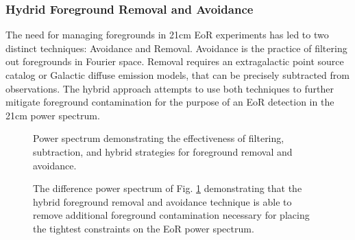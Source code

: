 \documentclass[a0,landscape]{a0poster}
\begin{document}
\begin{multicols}{4}
\subsubsection*{Hydrid Foreground Removal and Avoidance}
The need for managing foregrounds in 21cm EoR experiments has led to two distinct techniques: Avoidance and Removal. Avoidance is the practice of filtering out foregrounds in Fourier space. Removal requires an extragalactic point source catalog or Galactic diffuse emission models, that can be precisely subtracted from observations. The hybrid approach attempts to use both techniques to further mitigate foreground contamination for the purpose of an EoR detection in the 21cm power spectrum.

\begin{figure}[H]
\centering
{}
\caption{Power spectrum demonstrating the effectiveness of filtering, subtraction, and hybrid strategies for foreground removal and avoidance.}
\label{fig:stages}
\end{figure}

\begin{figure}[H]
\centering
{}
\caption{The difference power spectrum of Fig. \ref{fig:stages} demonstrating that the hybrid foreground removal and avoidance technique is able to remove 
additional foreground contamination necessary for placing the tightest constraints on the EoR power spectrum.}
\label{fig:diffmid}
\end{figure}


\end{multicols}
\end{document}
